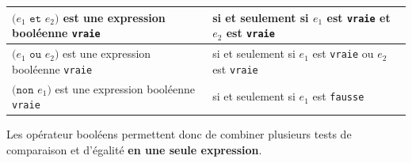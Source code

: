 \documentclass[a4paper,17pt]{extarticle}
\begin{document}
\begin{exemple}
\begin{longtable}[]{@{}ll@{}}
\toprule
\begin{minipage}[b]{0.47\columnwidth}\raggedright
\(\big( e_1 \texttt{ et } e_2 \big)\) est une expression booléenne
\texttt{vraie}\strut
\end{minipage} & \begin{minipage}[b]{0.47\columnwidth}\raggedright
si et seulement si \(e_1\) est \texttt{vraie} et \(e_2\) est
\texttt{vraie}\strut
\end{minipage}\tabularnewline
\midrule
\endhead
\begin{minipage}[t]{0.47\columnwidth}\raggedright
\(\big( e_1 \texttt{ ou } e_2 \big)\) est une expression booléenne
\texttt{vraie}\strut
\end{minipage} & \begin{minipage}[t]{0.47\columnwidth}\raggedright
si et seulement si \(e_1\) est \texttt{vraie} ou \(e_2\) est
\texttt{vraie}\strut
\end{minipage}\tabularnewline
\begin{minipage}[t]{0.47\columnwidth}\raggedright
\(\big( \texttt{non } e_1 \big)\) est une expression booléenne
\texttt{vraie}\strut
\end{minipage} & \begin{minipage}[t]{0.47\columnwidth}\raggedright
si et seulement si \(e_1\) est \texttt{fausse}\strut
\end{minipage}\tabularnewline
\bottomrule
\end{longtable}

        \end{exemple}
    Les opérateur booléens permettent donc de combiner plusieurs tests de
comparaison et d'égalité \textbf{en une seule expression}.
\end{document}
